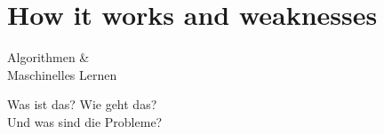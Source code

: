 \documentclass[aspectratio=169,x11names]{beamer}
\begin{document}
%
%
%


\section{How it works and weaknesses}

\begin{frame}
\begin{center}
\Huge
Algorithmen \&\\
Maschinelles Lernen
\bigskip

\LARGE
Was ist das? Wie geht das?\\ Und was sind die Probleme?
\end{center}
\end{frame}
\end{document}
